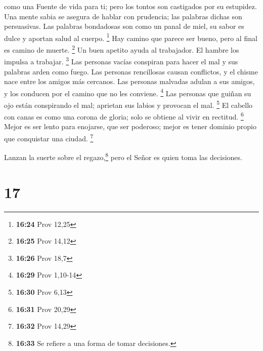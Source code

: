como una Fuente de vida para ti; pero los tontos son castigados por su
estupidez.  Una mente sabia se asegura de hablar con
prudencia; las palabras dichas son persuasivas.  Las
palabras bondadosas son como un panal de miel, su sabor es dulce y
aportan salud al cuerpo. \footnote{\textbf{16:24} Prov 12,25}
 Hay camino que parece ser bueno, pero al final es camino
de muerte. \footnote{\textbf{16:25} Prov 14,12}  Un buen
apetito ayuda al trabajador. El hambre los impulsa a trabajar.
\footnote{\textbf{16:26} Prov 18,7}  Las personas vacías
conspiran para hacer el mal y sus palabras arden como fuego.
 Las personas rencillosas causan conflictos, y el chisme
nace entre los amigos más cercanos.  Las personas
malvadas adulan a sus amigos, y los conducen por el camino que no les
conviene. \footnote{\textbf{16:29} Prov 1,10-14}  Las
personas que guiñan su ojo están conspirando el mal; aprietan sus labios
y provocan el mal. \footnote{\textbf{16:30} Prov 6,13} 
El cabello con canas es como una corona de gloria; solo se obtiene al
vivir en rectitud. \footnote{\textbf{16:31} Prov 20,29} 
Mejor es ser lento para enojarse, que ser poderoso; mejor es tener
dominio propio que conquistar una ciudad. \footnote{\textbf{16:32} Prov
  14,29}

 Lanzan la suerte sobre el regazo,\footnote{\textbf{16:33}
  Se refiere a una forma de tomar decisiones.} pero el Señor es quien
toma las decisiones.

\hypertarget{section-16}{%
\section{17}\label{section-16}}

